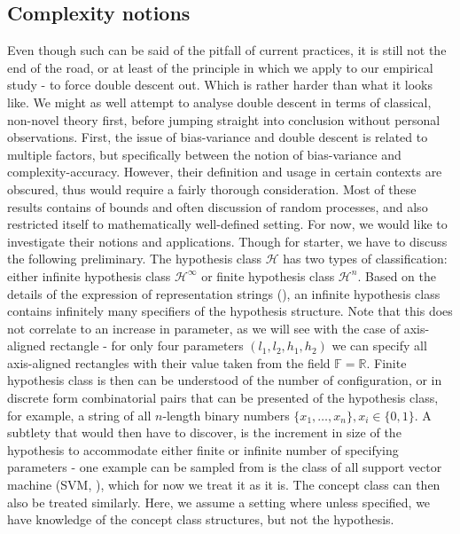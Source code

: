 \documentclass[10pt]{article} %
\begin{document}
\subsection{Complexity notions}
Even though such can be said of the pitfall of current practices, it is still not the end of the road, or at least of the principle in which we apply to our empirical study - to force double descent out. Which is rather harder than what it looks like. We might as well attempt to analyse double descent in terms of classical, non-novel theory first, before jumping straight into conclusion without personal observations. First, the issue of bias-variance and double descent is related to multiple factors, but specifically between the notion of bias-variance and complexity-accuracy. However, their definition and usage in certain contexts are obscured, thus would require a fairly thorough consideration. Most of these results contains of bounds and often discussion of random processes, and also restricted itself to mathematically well-defined setting. For now, we would like to investigate their notions and applications. Though for starter, we have to discuss the following preliminary. The hypothesis class $\mathcal{H}$ has two types of classification: either infinite hypothesis class $\mathcal{H}^{\infty}$ or finite hypothesis class $\mathcal{H}^{n}$. Based on the details of the expression of representation strings (\cite{10.5555/200548}), an infinite hypothesis class contains infinitely many specifiers of the hypothesis structure. Note that this does not correlate to an increase in parameter, as we will see with the case of axis-aligned rectangle - for only four parameters $(l_{1},l_{2},h_{1},h_2)$ we can specify all axis-aligned rectangles with their value taken from the field $\mathbb{F}=\mathbb{R}$. Finite hypothesis class is then can be understood of the number of configuration, or in discrete form combinatorial pairs that can be presented of the hypothesis class, for example, a string of all $n$-length binary numbers $\{x_{1},\dots,x_{n}\}, x_{i}\in \{0,1\}$. A subtlety that would then have to discover, is the increment in size of the hypothesis to accommodate either finite or infinite number of specifying parameters - one example can be sampled from is the class of all support vector machine (SVM, \cite{Vapnik1999-VAPTNO}), which for now we treat it as it is. The concept class can then also be treated similarly. Here, we assume a setting where unless specified, we have knowledge of the concept class structures, but not the hypothesis. 
\end{document}
